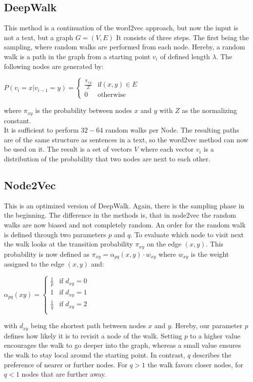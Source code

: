 \documentclass[sigconf]{acmart}
\begin{document}
\subsection{DeepWalk}
This method is a continuation of the word2vec approach, but now the input is not a text, but a graph \(G = (V,E)\)
It consists of three steps. The first being the sampling, where random walks are performed from each node.
Hereby, a random walk is a path in the graph from a starting point \(v_i\) of defined length \(\lambda\). 
The following nodes are generated by: 
\begin{center}
  \(P(v_i = x|v_{i-1} = y) = \begin{cases} \frac{\pi_{xy}}{Z} &\text{if} (x,y) \in E \\ 0 & \text{otherwise} \end{cases}\)
\end{center} 
where \(\pi_{xy}\) is the probability between nodes \(x\) and \(y\) with \(Z\) as the normalizing constant.\\
It is sufficient to perform \(32-64\) random walks per Node. The resulting paths are of the same structure as sentences in a text, so 
the word2vec method can now be used on it.
The result is a set of vectors \(V\) where each vector \(v_i\) is a distribution of the probability that two nodes are next to each other.
\cite{Godec.31.12.2018}


\subsection{Node2Vec}
This is an optimized version of DeepWalk.
Again, there is the sampling phase in the beginning. The difference in the methods is, that in node2vec the random walks are now biased and not completely random.
An order for the random walk is defined through two parameters \(p\) and \(q\). To evaluate which node to visit next the walk looks at the transition probability
\(\pi_{xy}\) on the edge \((x,y)\). This probability is now defined as \(\pi_{xy} = \alpha_{pq}(x, y) \cdot w_{xy}\) where \(w_{xy}\) is the weight assigned to the edge \((x,y)\) and:
\begin{center}
 \(\alpha_{pq}(xy) = \begin{cases} \frac{1}{p} & \text{if } d_{xy} = 0 \\ 1 & \text{if } d_{xy} = 1 \\\frac{1}{q} & \text{if } d_{xy} = 2 \\\end{cases}\)
\end{center}
with \(d_{xy}\) being the shortest path between nodes \(x\) and \(y\).
Hereby, our parameter \(p\) defines how likely it is to revisit a node of the walk. Setting \(p\) to a higher value encourages the walk to go deeper into the graph, whereas a small value 
ensures the walk to stay local around the starting point. 
In contrast, \(q\) describes the preference of nearer or further nodes. For \(q>1\) the walk favors closer nodes, for \(q<1\) nodes that are further away.
\cite{Grover.03.07.2016}
\end{document}
